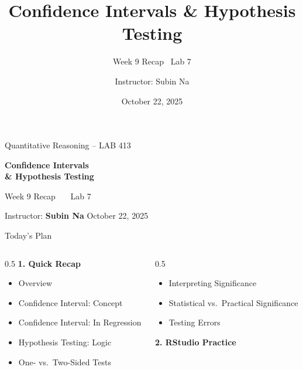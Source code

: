 \documentclass[aspectratio=169,11pt]{beamer}
\title{\bfseries Confidence Intervals \& Hypothesis Testing}
\subtitle{Week 9 Recap \textbullet\ Lab 7}
\author{Instructor: Subin Na}
\institute{Quantitative Reasoning -- LAB 413}
\date{October 22, 2025}
\begin{document}
{
\begin{frame}
  \vfill
  {\color{qrgray}\small Quantitative Reasoning -- LAB 413}\\[0.6em]
  {\color{qrnavy}\huge\bfseries Confidence Intervals\\[0.15em]\& Hypothesis Testing\par}
  \vspace{0.4em}
  {\color{qrblue}\large Week 9 Recap \ \textbullet\ \ Lab 7}\par
  \vspace{1.6em}
  {\color{qrgray} Instructor: \textbf{Subin Na} \hfill October 22, 2025}
  \vfill
\end{frame}
}

\begin{frame}{Today's Plan}
  \begin{columns}[T]
    \begin{column}{0.5\textwidth}
      \textbf{\color{qrnavy}1. Quick Recap}
      \begin{itemize}
        \item Overview
        \item Confidence Interval: Concept
        \item Confidence Interval: In Regression
        \item Hypothesis Testing: Logic
        \item One- vs.\ Two-Sided Tests
      \end{itemize}
    \end{column}
    \begin{column}{0.5\textwidth}
      \begin{itemize}
        \item Interpreting Significance
        \item Statistical vs.\ Practical Significance
        \item Testing Errors
      \end{itemize}
      \vspace{0.8em}
      \textbf{\color{qrnavy}2. RStudio Practice}
    \end{column}
  \end{columns}
\end{frame}
\end{document}
